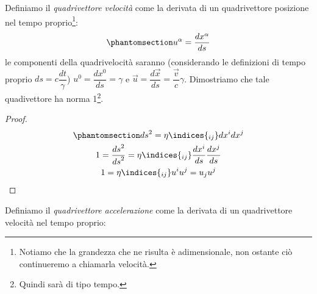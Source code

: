 Definiamo il \textit{quadrivettore velocità} come la derivata di un quadrivettore posizione nel tempo proprio\footnote{Notiamo che la grandezza che ne risulta è adimensionale, non ostante ciò continueremo a chiamarla velocità.}:
\begin{equation}\phantomsection\label{eq:def_qvel}
    u^\alpha=\dfrac{dx^\alpha}{ds}
\end{equation}
le componenti della quadrivelocità saranno (considerando le definizioni di tempo proprio $ds=c\dfrac{dt}{\gamma}$) $u^0=\dfrac{dx^0}{ds}=\gamma$ e $\Vec{u}=\dfrac{d\vec{x}}{ds}=\dfrac{\vec{v}}{c}\gamma$. Dimostriamo che tale quadivettore ha norma 1\footnote{Quindi sarà di tipo tempo.}.
\begin{proof}
\begin{equation}
    \begin{gathered}\phantomsection\label{eq:Norm_Vel}
      {ds}^2=\eta\indices{_{ij}}dx^idx^j    \\
  1=\dfrac{{ds}^2}{{ds}^2}=\eta\indices{_{ij}}\dfrac{dx^i}{ds}\dfrac{dx^j}{ds}   \\
1=\eta\indices{_{ij}}u^iu^j=u_ju^j
\end{gathered}
\end{equation}

\end{proof}
Definiamo il \textit{quadrivettore accelerazione} come la derivata di un quadrivettore velocità nel tempo proprio:

